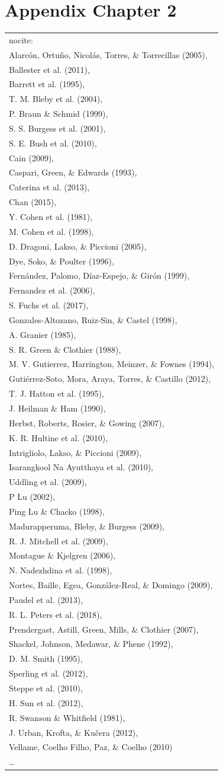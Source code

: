 \documentclass[11pt,twoside]{reedthesis}
\begin{document}
\chapter{Appendix Chapter 2}\label{appendix-chapter-2}
\begin{longtable}[]{@{}l@{}}
\toprule
\newpage\tabularnewline
\midrule
\endhead
nocite: \textbar{}\tabularnewline
Alarcón, Ortuño, Nicolás, Torres, \& Torrecillas (2005),\tabularnewline
Ballester et al. (2011),\tabularnewline
Barrett et al. (1995),\tabularnewline
T. M. Bleby et al. (2004),\tabularnewline
P. Braun \& Schmid (1999),\tabularnewline
S. S. Burgess et al. (2001),\tabularnewline
S. E. Bush et al. (2010),\tabularnewline
Cain (2009),\tabularnewline
Caspari, Green, \& Edwards (1993),\tabularnewline
Caterina et al. (2013),\tabularnewline
Chan (2015),\tabularnewline
Y. Cohen et al. (1981),\tabularnewline
M. Cohen et al. (1998),\tabularnewline
D. Dragoni, Lakso, \& Piccioni (2005),\tabularnewline
Dye, Soko, \& Poulter (1996),\tabularnewline
Fernández, Palomo, Díaz-Espejo, \& Girón (1999),\tabularnewline
Fernandez et al. (2006),\tabularnewline
S. Fuchs et al. (2017),\tabularnewline
Gonzales-Altozano, Ruiz-Sin, \& Castel (1998),\tabularnewline
A. Granier (1985),\tabularnewline
S. R. Green \& Clothier (1988),\tabularnewline
M. V. Gutierrez, Harrington, Meinzer, \& Fownes (1994),\tabularnewline
Gutiérrez-Soto, Mora, Araya, Torres, \& Castillo (2012),\tabularnewline
T. J. Hatton et al. (1995),\tabularnewline
J. Heilman \& Ham (1990),\tabularnewline
Herbst, Roberts, Rosier, \& Gowing (2007),\tabularnewline
K. R. Hultine et al. (2010),\tabularnewline
Intrigliolo, Lakso, \& Piccioni (2009),\tabularnewline
Isarangkool Na Ayutthaya et al. (2010),\tabularnewline
Uddling et al. (2009),\tabularnewline
P Lu (2002),\tabularnewline
Ping Lu \& Chacko (1998),\tabularnewline
Madurapperuma, Bleby, \& Burgess (2009),\tabularnewline
R. J. Mitchell et al. (2009),\tabularnewline
Montague \& Kjelgren (2006),\tabularnewline
N. Nadezhdina et al. (1998),\tabularnewline
Nortes, Baille, Egea, González-Real, \& Domingo (2009),\tabularnewline
Paudel et al. (2013),\tabularnewline
R. L. Peters et al. (2018),\tabularnewline
Prendergast, Astill, Green, Mills, \& Clothier (2007),\tabularnewline
Shackel, Johnson, Medawar, \& Phene (1992),\tabularnewline
D. M. Smith (1995),\tabularnewline
Sperling et al. (2012),\tabularnewline
Steppe et al. (2010),\tabularnewline
H. Sun et al. (2012),\tabularnewline
R. Swanson \& Whitfield (1981),\tabularnewline
J. Urban, Krofta, \& Kučera (2012),\tabularnewline
Vellame, Coelho Filho, Paz, \& Coelho (2010)\tabularnewline
\ldots{}\tabularnewline
\bottomrule
\end{longtable}
\end{document}
